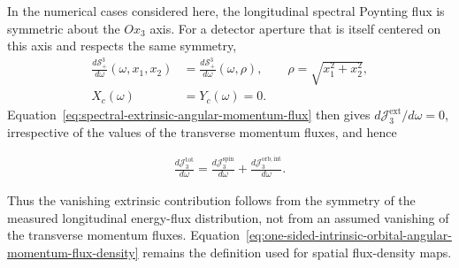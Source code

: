 In the numerical cases considered here, the longitudinal spectral Poynting
flux is symmetric about the $Ox_3$ axis.  For a detector aperture that is
itself centered on this axis and respects the same symmetry,
\begin{align}
  \frac{d\mathcal S^3_+}{d\omega}(\omega,x_1,x_2)
  &=\frac{d\mathcal S^3_+}{d\omega}(\omega,\rho),
  \qquad \rho=\sqrt{x_1^2+x_2^2},\nonumber\\
  X_c(\omega)&=Y_c(\omega)=0.
  \label{eq:vanishing-energy-flux-centroid}
\end{align}
Equation~\eqref{eq:spectral-extrinsic-angular-momentum-flux} then gives
$d\mathcal J^{\mathrm{ext}}_3/d\omega=0$, irrespective of the values of the
transverse momentum fluxes, and hence
\begin{importantbox}
\begin{align}
  \frac{d\mathcal J^{\mathrm{tot}}_3}{d\omega}
  =\frac{d\mathcal J^{\mathrm{spin}}_3}{d\omega}
  +\frac{d\mathcal J^{\mathrm{orb,int}}_3}{d\omega}.
  \label{eq:angular-momentum-split-zero-extrinsic}
\end{align}
\end{importantbox}
Thus the vanishing extrinsic contribution follows from the symmetry of the
measured longitudinal energy-flux distribution, not from an assumed
vanishing of the transverse momentum fluxes.  Equation~\eqref{eq:one-sided-intrinsic-orbital-angular-momentum-flux-density}
remains the definition used for spatial flux-density maps.
